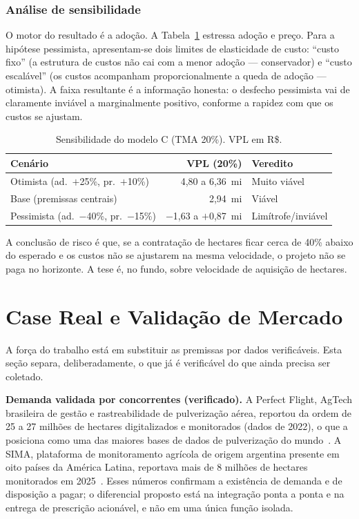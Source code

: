 \documentclass[conference]{IEEEtran}
\newcommand{\rs}{R\$}
\begin{document}
\subsubsection{Análise de sensibilidade}
\label{sec:sens}
O motor do resultado é a adoção. A Tabela~\ref{tab:sens} estressa adoção e preço. Para a hipótese pessimista, apresentam-se dois limites de elasticidade de custo: ``custo fixo'' (a estrutura de custos não cai com a menor adoção --- conservador) e ``custo escalável'' (os custos acompanham proporcionalmente a queda de adoção --- otimista). A faixa resultante é a informação honesta: o desfecho pessimista vai de claramente inviável a marginalmente positivo, conforme a rapidez com que os custos se ajustam.

\begin{table}[!t]
\caption{Sensibilidade do modelo C (TMA 20\%). VPL em \rs.}
\label{tab:sens}
\centering
\footnotesize
\begin{tabular}{@{}lrl@{}}
\toprule
\textbf{Cenário} & \textbf{VPL (20\%)} & \textbf{Veredito} \\
\midrule
Otimista (ad.\ $+$25\%, pr.\ $+$10\%) & 4,80 a 6,36~mi & Muito viável \\
Base (premissas centrais) & 2,94~mi & Viável \\
Pessimista (ad.\ $-$40\%, pr.\ $-$15\%) & $-$1,63 a $+$0,87~mi & Limítrofe/inviável \\
\bottomrule
\end{tabular}
\end{table}

A conclusão de risco é que, se a contratação de hectares ficar cerca de 40\% abaixo do esperado e os custos não se ajustarem na mesma velocidade, o projeto não se paga no horizonte. A tese é, no fundo, sobre velocidade de aquisição de hectares.

\section{Case Real e Validação de Mercado}
\label{sec:case}
A força do trabalho está em substituir as premissas por dados verificáveis. Esta seção separa, deliberadamente, o que já é verificável do que ainda precisa ser coletado.

\textbf{Demanda validada por concorrentes (verificado).} A Perfect Flight, AgTech brasileira de gestão e rastreabilidade de pulverização aérea, reportou da ordem de 25 a 27 milhões de hectares digitalizados e monitorados (dados de 2022), o que a posiciona como uma das maiores bases de dados de pulverização do mundo~\cite{perfectflight,perfectflight_news}. A SIMA, plataforma de monitoramento agrícola de origem argentina presente em oito países da América Latina, reportava mais de 8 milhões de hectares monitorados em 2025~\cite{sima,sima_news}. Esses números confirmam a existência de demanda e de disposição a pagar; o diferencial proposto está na integração ponta a ponta e na entrega de prescrição acionável, e não em uma única função isolada.
\end{document}
